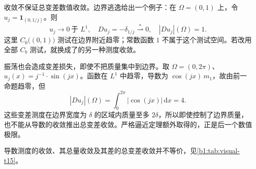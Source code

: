\ProseParagraphBreak

\WeakStar{}收敛不保证总变差数值收敛。边界逃逸给出一个例子：在
\(\Omega=(0,1)\) 上，令 \(u_j=\mathbf1_{(0,1/j)}\)。则
\[
 u_j\to0\ \text{于 }L^1,\quad
 Du_j=-\delta_{1/j}\overset{*}{\rightharpoonup}0,\quad
 |Du_j|(\Omega)=1.
\]
这里 \(C_0\bigl((0,1)\bigr)\) 测试在边界附近趋零；常数函数 \(1\) 不属于这个测试空间。若改用全部 \(C_b\) 测试，就换成了的另一种测度收敛。

\ProseParagraphBreak

振荡也会造成变差损失，即使不把质量集中到边界。取
\(\Omega=(0,2\pi)\)、\(u_j(x)=j^{-1}\cdot \sin(jx)\)。函数在 \(L^1\) 中趋零，导数为 \(\cos(jx)\,m_1\)，故由前一命题\WeakStar{}趋零，但
\[
 |Du_j|(\Omega)=\int_0^{2\pi}|\cos(jx)|\,\mathrm dx=4.
\]
这些变差测度在边界宽度为 \(\delta\) 的区域内质量至多 \(2\delta\)，所以即使控制了边界质量，也不能从导数的\WeakStar{}收敛推出总变差收敛。严格逼近定理额外取得的，正是后一个数值极限。

导数测度的收敛、其总量收敛及其差的总变差收敛并不等价，见\cref{b1:tab:visual-t15}。

